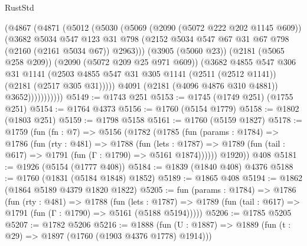 \begin{lexlean}{RustStd}
\begin{coremodule}
                    (@4867
                      (@4871
                        (@5012
                          (@5030
                            (@5069
                              (@2090 (@5072 @222 @202 @1145 @609))
                              (@3682
                                @5034
                                @547
                                @123
                                @31
                                @798
                                (@2152
                                  @5034
                                  @547
                                  @67
                                  @31
                                  @67
                                  @798
                                  (@2160 (@2161 @5034 @67))
                                  @2963)))
                            (@3905 (@5060 @23))
                            (@2181 (@5065 @258 @209))
                            (@2090 (@5072 @209 @25 @971 @609))
                            (@3682
                              @4855
                              @547
                              @306
                              @31
                              @1141
                              (@2503
                                @4855
                                @547
                                @31
                                @305
                                @1141
                                (@2511 (@2512 @1141))
                                (@2181 (@2517 @305 @31)))))
                          @4091
                          (@2181 (@4096 @4876 @310 @4881))
                          @3652)))))))))))
@5149 := @1743 @251
@5153 := @1745 (@1749 @251) (@1755 @251)
@5154 := @1764 @4373
@5156 := @1760 (@5154 @1779)
@5158 := @1802 (@1803 @251)
@5159 := @1798 @5158
@5161 := @1760 (@5159 @1827)
@5178 := @1759
    (fun (fn : @7) =>
    @5156
      (@1782
        (@1785
          (fun (params : @1784) =>
          @1786
            (fun (rty : @481) =>
            @1788
              (fun (lets : @1787) =>
              @1789 (fun (tail : @617) => @1791 (fun (Γ : @1790) => @5161 @1874))))))
        @1920))
    @408
@5181 := @1926 (@5154 (@1777 @408))
@5184 := @1839 (@1840 @408) @4376
@5188 := @1760 (@1831 (@5184 @1848) @1852)
@5189 := @1865 @408
@5194 := @1862 (@1864 @5189 @4379 @1820 @1822)
@5205 := fun (params : @1784) =>
  @1786
    (fun (rty : @481) =>
    @1788
      (fun (lets : @1787) =>
      @1789 (fun (tail : @617) => @1791 (fun (Γ : @1790) => @5161 (@5188 @5194)))))
@5206 := @1785 @5205
@5207 := @1782 @5206
@5216 := @1888 (fun (U : @1887) => @1889 (fun (t : @29) => @1897 (@1760 (@1903 @4376 @1778) @1914)))

\end{coremodule}
\end{lexlean}
